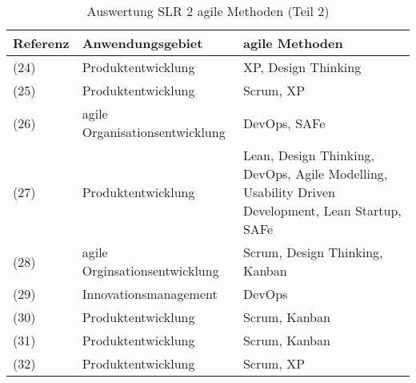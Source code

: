 \begin{sidewaystable}[ht]
	\centering
	\caption[Auswertung SLR 2 agile Methoden (Teil 2)]{Auswertung SLR 2 agile Methoden (Teil 2) \protect \footnotemark}
	\begin{tabular}{|l|p{8cm}|p{8cm}|}
		\hline
		\textbf{Referenz}                                            & \textbf{Anwendungsgebiet}                                                                                                &\textbf{agile Methoden}                                                                       \\
		\hline
		(24)                                & Produktentwicklung                                                                                                 & XP, Design Thinking                                                                              \\
		(25)      & Produktentwicklung                                                                                                 & Scrum, XP                                                                                        \\
		(26)                                 & agile Organisationsentwicklung                                                                                     & DevOps, SAFe                                                                                     \\
		(27)                   & Produktentwicklung                                                                                                 & Lean, Design Thinking, DevOps, Agile Modelling, Usability Driven Development, Lean Startup, SAFe \\
		(28)                                  & agile Orginsationsentwicklung                                                                                      & Scrum, Design Thinking, Kanban                                                                   \\
		(29)            & Innovationsmanagement                                                                                              & DevOps                                                                                           \\
		(30)                              & Produktentwicklung                                                                                                 & Scrum, Kanban                                                                                    \\
		(31) & Produktentwicklung                                                                                                 & Scrum, Kanban                                                                                    \\
		(32)                  & Produktentwicklung                                                                                                 & Scrum, XP                                                                                       \\
		\hline
	\end{tabular}
	\label{tab:clusteringslr2-2}
\end{sidewaystable}
